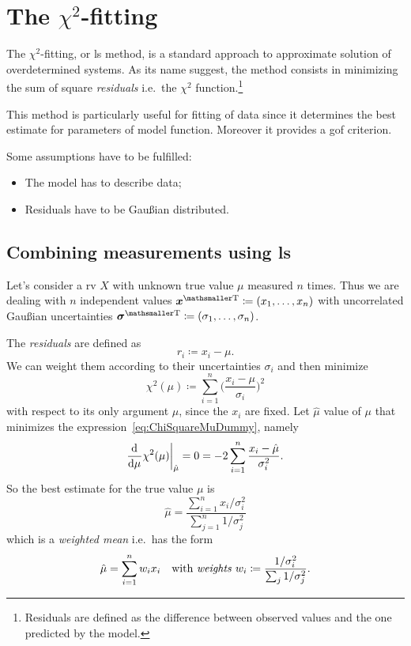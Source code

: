 \section{The $\chi^2$-fitting}

The $\chi^2$-fitting, or \ac{ls} method, is a standard approach to approximate solution of overdetermined systems.
As its name suggest, the method consists in minimizing the sum of square \emph{residuals} i.e.~the $\chi^2$ function.\footnote{Residuals are defined as the difference between observed values and the one predicted by the model.}


This method is particularly useful for fitting of data since it determines the best estimate for parameters of model function.
Moreover it provides a \ac{gof} criterion.


Some assumptions have to be fulfilled:
\begin{itemize}
	\item
		The model has to describe data;
	\item
		Residuals have to be Gau\ss{}ian distributed.
\end{itemize}

\subsection{Combining measurements using \acs{ls}}

Let's consider a \ac{rv} $X$ with unknown true value $\mu$ measured $n$ times.
Thus we are dealing with $n$ independent values $\transpose{\vec{x} } \coloneqq (x_1,\dots,x_n)$ with uncorrelated Gau\ss{}ian uncertainties $\transpose{\vec{\sigma}} \coloneqq (\sigma_1,\dots,\sigma_n)$.


The \emph{residuals} are defined as
\begin{equation}
	r_i \coloneqq x_i-\mu.
\end{equation}
We can weight them according to their uncertainties $\sigma_i$ and then minimize
\begin{equation}\label{eq:ChiSquareMuDummy}
	\chi^2(\mu) \coloneqq \sum_{i=1}^n \biggl(\frac{x_i - \mu}{\sigma_i}\biggr)^2
\end{equation}
with respect to its only argument $\mu$, since the $x_i$ are fixed.
Let $\hat \mu$ value of $\mu$ that minimizes the expression~\eqref{eq:ChiSquareMuDummy}, namely
\begin{equation}
	\dfrac{\mathop{}\!\mathrm{d}^{}}{\mathop{}\!\mathrm{d} \mu^{}}\chi^2(\mu)\bigg\rvert_{\hat\mu} = 0 = -2\sum_{i=1}^n \frac{x_i-\hat\mu}{\sigma_i^2}.
\end{equation}
So the best estimate for the true value $\mu$ is
\begin{equation}
	\hat\mu = \frac{\sum_{i=1}^n x_i/\sigma_i^2}{\sum_{j=1}^n 1/\sigma_j^2}
\end{equation}
which is a \emph{weighted mean} i.e.~has the form
\begin{equation}
	\hat\mu = \sum_{i=1}^n w_ix_i
	\quad
	\text{with \emph{weights}\index{weight} }
	w_i \coloneqq \frac{1/\sigma_i^2}{\sum_{j}1/\sigma_j^2}.
\end{equation}

